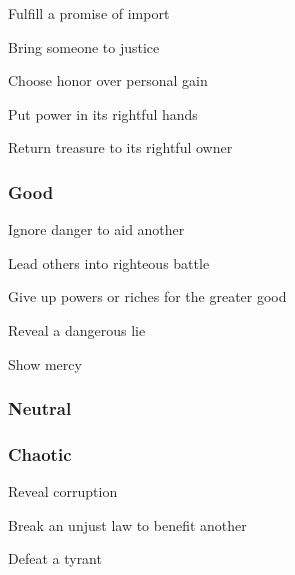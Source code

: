          
\item Fulfill a promise of import

         
\item Bring someone to justice

         
\item Choose honor over personal gain

         
\item Put power in its rightful hands

         
\item Return treasure to its rightful owner

       
\stopitemize
       
\subsubsection{Good}   
       
\startitemize[1,packed]
         
\item Ignore danger to aid another

         
\item Lead others into righteous battle

         
\item Give up powers or riches for the greater good

         
\item Reveal a dangerous lie

         
\item Show mercy

       
\stopitemize
       
\subsubsection{Neutral}   
       
\subsubsection{Chaotic}   
       
\startitemize[1,packed]
         
\item Reveal corruption

         
\item Break an unjust law to benefit another

         
\item Defeat a tyrant

